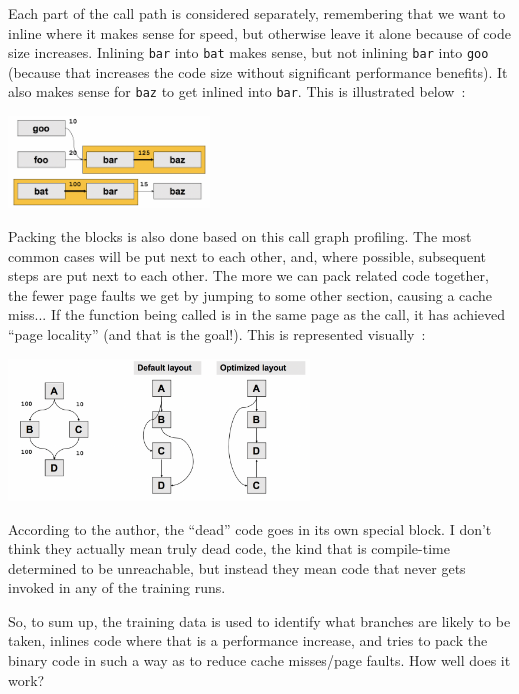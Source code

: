 \documentclass[a4paper]{report}
\begin{document}
Each part of the call path is considered separately, remembering that we want to inline where it makes sense for speed, but otherwise leave it alone because of code size increases. Inlining \texttt{bar} into \texttt{bat} makes sense, but not inlining \texttt{bar} into \texttt{goo} (because that increases the code size without significant performance benefits). It also makes sense for \texttt{baz} to get inlined into \texttt{bar}. This is illustrated below~\cite{pogo2}:

\begin{center}
	\includegraphics[width=0.4\textwidth]{images/callpaths4.png}
\end{center}

Packing the blocks is also done based on this call graph profiling. The most common cases will be put next to each other, and, where possible, subsequent steps are put next to each other. The more we can pack related code together, the fewer page faults we get by jumping to some other section, causing a cache miss... If the function being called is in the same page as the call, it has achieved ``page locality'' (and that is the goal!). This is represented visually~\cite{pogo2}:

\begin{center}
	\includegraphics[width=0.6\textwidth]{images/blocklayout.png}
\end{center}

According to the author, the ``dead'' code goes in its own special block. I don't think they actually mean truly dead code, the kind that is compile-time determined to be unreachable, but instead they mean code that never gets invoked in any of the training runs.

So, to sum up, the training data is used to identify what branches are likely to be taken, inlines code where that is a performance increase, and tries to pack the binary code in such a way as to reduce cache misses/page faults. How well does it work?
\end{document}
